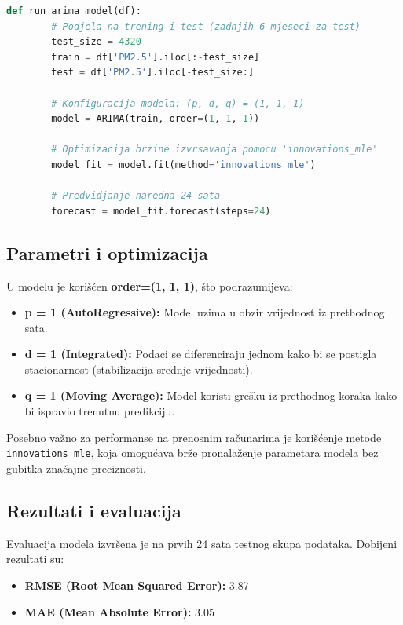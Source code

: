 \documentclass[12pt,a4paper]{article}
\begin{document}
	\begin{lstlisting}[language=Python, caption=Implementacija ARIMA modela]
		def run_arima_model(df):
		# Podjela na trening i test (zadnjih 6 mjeseci za test)
		test_size = 4320 
		train = df['PM2.5'].iloc[:-test_size]
		test = df['PM2.5'].iloc[-test_size:]
		
		# Konfiguracija modela: (p, d, q) = (1, 1, 1)
		model = ARIMA(train, order=(1, 1, 1))
		
		# Optimizacija brzine izvrsavanja pomocu 'innovations_mle'
		model_fit = model.fit(method='innovations_mle') 
		
		# Predvidjanje naredna 24 sata
		forecast = model_fit.forecast(steps=24)
	\end{lstlisting}
	
	\subsection{Parametri i optimizacija}
	
	U modelu je korišćen \textbf{order=(1, 1, 1)}, što podrazumijeva:
	\begin{itemize}
		\item \textbf{p = 1 (AutoRegressive):} Model uzima u obzir vrijednost iz prethodnog sata.
		\item \textbf{d = 1 (Integrated):} Podaci se diferenciraju jednom kako bi se postigla stacionarnost (stabilizacija srednje vrijednosti).
		\item \textbf{q = 1 (Moving Average):} Model koristi grešku iz prethodnog koraka kako bi ispravio trenutnu predikciju.
	\end{itemize}
	
	Posebno važno za performanse na prenosnim računarima je korišćenje metode \texttt{innovations\_mle}, koja omogućava brže pronalaženje parametara modela bez gubitka značajne preciznosti.
	
	\subsection{Rezultati i evaluacija}
	
	Evaluacija modela izvršena je na prvih 24 sata testnog skupa podataka. Dobijeni rezultati su:
	\begin{itemize}
		\item \textbf{RMSE (Root Mean Squared Error):} 3.87
		\item \textbf{MAE (Mean Absolute Error):} 3.05
	\end{itemize}
	
\end{document}
